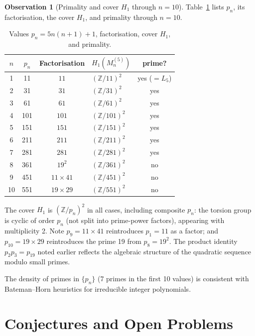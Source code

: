 \documentclass[11pt,a4paper]{article}
\theoremstyle{definition}
\newtheorem{observation}[theorem]{Observation}
\newcommand{\ZZ}{\mathbb{Z}}
\begin{document}
\begin{observation}[Primality and cover $H_1$ through $n=10$]
Table~\ref{tab:primality} lists $p_n$, its factorisation,
the cover $H_1$, and primality through $n=10$.

\begin{table}[htbp]
\centering
\caption{Values $p_n=5n(n+1)+1$, factorisation,
cover $H_1$, and primality.}
\label{tab:primality}
\begin{tabular}{ccclc}
\toprule
$n$ & $p_n$ & Factorisation & $H_1(M_n^{(5)})$ & prime? \\
\midrule
 1 &   11 & $11$           & $(\ZZ/11)^2$  & yes ($=L_5$) \\
 2 &   31 & $31$           & $(\ZZ/31)^2$  & yes \\
 3 &   61 & $61$           & $(\ZZ/61)^2$  & yes \\
 4 &  101 & $101$          & $(\ZZ/101)^2$ & yes \\
 5 &  151 & $151$          & $(\ZZ/151)^2$ & yes \\
 6 &  211 & $211$          & $(\ZZ/211)^2$ & yes \\
 7 &  281 & $281$          & $(\ZZ/281)^2$ & yes \\
 8 &  361 & $19^2$         & $(\ZZ/361)^2$ & no \\
 9 &  451 & $11\times41$   & $(\ZZ/451)^2$ & no \\
10 &  551 & $19\times29$   & $(\ZZ/551)^2$ & no \\
\bottomrule
\end{tabular}
\end{table}

The cover $H_1$ is $(\ZZ/p_n)^2$ in all cases, including
composite $p_n$: the torsion group is cyclic of order $p_n$
(not split into prime-power factors), appearing with multiplicity 2.
Note $p_9 = 11 \times 41$ reintroduces $p_1 = 11$ as a factor;
and $p_{10} = 19 \times 29$ reintroduces the prime 19
from $p_8 = 19^2$. The product identity $p_2 p_3 = p_{19}$
noted earlier reflects the algebraic structure of the quadratic
sequence modulo small primes.

The density of primes in $\{p_n\}$ (7 primes in the first 10 values)
is consistent with Bateman--Horn heuristics for irreducible
integer polynomials.
\end{observation}

\section{Conjectures and Open Problems}
\label{sec:conjectures}
\end{document}
